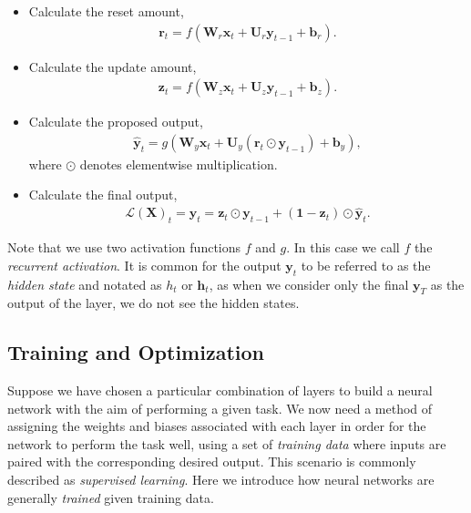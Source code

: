 \documentclass{somasmsc}
\begin{document}
\begin{itemize}
    \item Calculate the reset amount,
    \begin{align*}
    \pmb{r}_t = f\left(\mathbf{W}_r \pmb{x}_t + \mathbf{U}_r \pmb{y}_{t-1} + \pmb{b}_r\right).
    \end{align*}
    \item Calculate the update amount,
    \begin{align*}
    \pmb{z}_t = f\left(\mathbf{W}_z \pmb{x}_t + \mathbf{U}_z \pmb{y}_{t-1} + \pmb{b}_z\right).
    \end{align*}
    \item Calculate the proposed output,
    \begin{align*}
    \hat{\pmb{y}}_t = g\left(\mathbf{W}_y \pmb{x}_t + \mathbf{U}_y \left(\pmb{r}_t \odot \pmb{y}_{t-1}\right) + \pmb{b}_y\right),
    \end{align*}
    where $\odot$ denotes elementwise  multiplication.
    \item Calculate the final output,
    \begin{align*}
    \mathcal{L}\left(\mathbf{X}\right)_t = \pmb{y}_t = \pmb{z}_t \odot \pmb{y}_{t-1} + \left(\mathbf{1} - \pmb{z}_t\right) \odot \hat{\pmb{y}}_t.
    \end{align*}
\end{itemize}
Note that we use two activation functions $f$ and $g$. In this case we call $f$ the \textit{recurrent activation}. It is common for the output $\pmb{y}_t$ to be referred to as the \textit{hidden state} and notated as $h_t$ or $\pmb{h}_t$, as when we consider only the final $\pmb{y}_T$ as the output of the layer, we do not see the hidden states.

\subsection{Training and Optimization}\label{intro:train}

Suppose we have chosen a particular combination of layers to build a neural network with the aim of performing a given task. We now need a method of assigning the weights and biases associated with each layer in order for the network to perform the task well, using a set of \textit{training data} where inputs are paired with the corresponding desired output. This scenario is commonly described as \textit{supervised learning}. Here we introduce how neural networks are generally \textit{trained} given training data.
\end{document}

